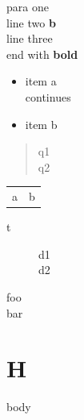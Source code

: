 \documentclass[11pt]{article}
\author{root}
\date{\today}
\title{}
\begin{document}
\tableofcontents

para one\\[0pt]
line two \textbf{b}\\[0pt]
line three\\[0pt]
end with \textbf{bold}\\[0pt]

\begin{itemize}
\item item a\\[0pt]
continues\\[0pt]
\item item b\\[0pt]
\end{itemize}

\begin{quote}
q1\\[0pt]
q2\\[0pt]
\end{quote}

\begin{center}
\begin{tabular}{ll}
a & b\\[0pt]
\end{tabular}
\end{center}

\begin{description}
\item[{t}] d1\\[0pt]
d2\\[0pt]
\end{description}

foo \\[0pt]
bar\\[0pt]
\section{H}
\label{sec:org2b8c2ef}
body\\[0pt]
\end{document}
